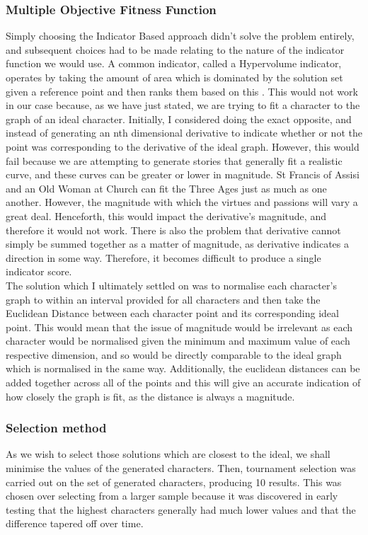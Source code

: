 \documentclass[11pt]{article}
\begin{document}
\subsubsection{Multiple Objective Fitness Function}
Simply choosing the Indicator Based approach didn't solve the problem entirely, and subsequent choices had to be made relating to the nature of the indicator function we would use. A common indicator, called a Hypervolume indicator, operates by taking the amount of area which is dominated by the solution set given a reference point and then ranks them based on this \cite{AchievementScalarazingIndicatorBased}. This would not work in our case because, as we have just stated, we are trying to fit a character to the graph of an ideal character. Initially, I considered doing the exact opposite, and instead of generating an nth dimensional derivative to indicate whether or not the point was corresponding to the derivative of the ideal graph. However, this would fail because we are attempting to generate stories that generally fit a realistic curve, and these curves can be greater or lower in magnitude. St Francis of Assisi and an Old Woman at Church can fit the Three Ages just as much as one another. However, the magnitude with which the virtues and passions will vary a great deal. Henceforth, this would impact the derivative's magnitude, and therefore it would not work. There is also the problem that derivative cannot simply be summed together as a matter of magnitude, as derivative indicates a direction in some way. Therefore, it becomes difficult to produce a single indicator score.  \\

The solution which I ultimately settled on was to normalise each character's graph to within an interval provided for all characters and then take the Euclidean Distance between each character point and its corresponding ideal point. This would mean that the issue of magnitude would be irrelevant as each character would be normalised given the minimum and maximum value of each respective dimension, and so would be directly comparable to the ideal graph which is normalised in the same way. Additionally, the euclidean distances can be added together across all of the points and this will give an accurate indication of how closely the graph is fit, as the distance is always a magnitude. 

\subsubsection{Selection method}
As we wish to select those solutions which are closest to the ideal, we shall minimise the values of the generated characters. Then, tournament selection was carried out on the set of generated characters, producing 10 results. This was chosen over selecting from a larger sample because it was discovered in early testing that the highest characters generally had much lower values and that the difference tapered off over time. 
\end{document}
